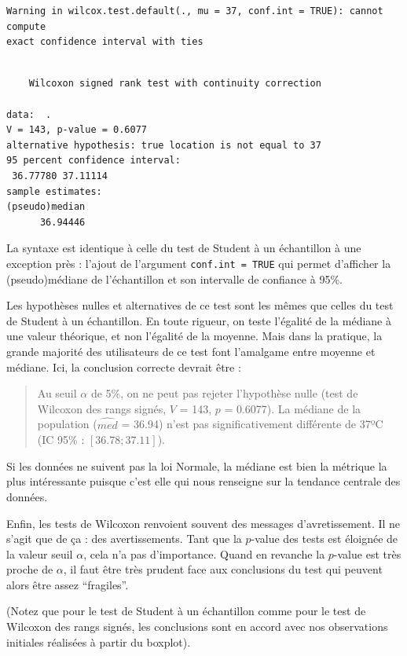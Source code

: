 \documentclass[
  a4paper,
]{article}
\begin{document}
\begin{verbatim}
Warning in wilcox.test.default(., mu = 37, conf.int = TRUE): cannot compute
exact confidence interval with ties
\end{verbatim}

\begin{verbatim}

    Wilcoxon signed rank test with continuity correction

data:  .
V = 143, p-value = 0.6077
alternative hypothesis: true location is not equal to 37
95 percent confidence interval:
 36.77780 37.11114
sample estimates:
(pseudo)median 
      36.94446 
\end{verbatim}

La syntaxe est identique à celle du test de Student à un échantillon à une exception près : l'ajout de l'argument \texttt{conf.int\ =\ TRUE} qui permet d'afficher la (pseudo)médiane de l'échantillon et son intervalle de confiance à 95\%.

Les hypothèses nulles et alternatives de ce test sont les mêmes que celles du test de Student à un échantillon. En toute rigueur, on teste l'égalité de la médiane à une valeur théorique, et non l'égalité de la moyenne. Mais dans la pratique, la grande majorité des utilisateurs de ce test font l'amalgame entre moyenne et médiane. Ici, la conclusion correcte devrait être :

\begin{quote}
Au seuil \(\alpha\) de 5\%, on ne peut pas rejeter l'hypothèse nulle (test de Wilcoxon des rangs signés, \(V\) = 143, \(p\) = 0.6077). La médiane de la population (\(\widehat{med}\) = 36.94) n'est pas significativement différente de 37ºC (IC 95\% : \([36.78 ; 37.11]\)).
\end{quote}

Si les données ne suivent pas la loi Normale, la médiane est bien la métrique la plus intéressante puisque c'est elle qui nous renseigne sur la tendance centrale des données.

Enfin, les tests de Wilcoxon renvoient souvent des messages d'avretissement. Il ne s'agit que de ça : des avertissements. Tant que la \(p\)-value des tests est éloignée de la valeur seuil \(\alpha\), cela n'a pas d'importance. Quand en revanche la \(p\)-value est très proche de \(\alpha\), il faut être très prudent face aux conclusions du test qui peuvent alors être assez ``fragiles''.

(Notez que pour le test de Student à un échantillon comme pour le test de Wilcoxon des rangs signés, les conclusions sont en accord avec nos observations initiales réalisées à partir du boxplot).
\end{document}
